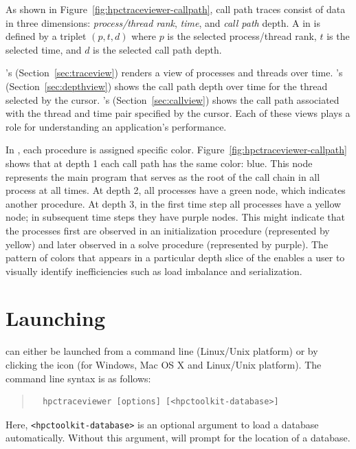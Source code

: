 As shown in Figure~\ref{fig:hpctraceviewer-callpath},  call path traces consist of data in three dimensions: \emph{process/thread rank}, \emph{time}, and \emph{call path} depth.
A \emph{\crosshair} in \hpctraceviewer{} is defined by a triplet $(p,t,d)$ where $p$ is the selected process/thread rank, $t$ is the selected time, and $d$ is the selected call path depth. 

\hpctraceviewer{}'s  \emph{\traceview} (Section~\ref{sec:traceview}) renders a view of processes and threads over time. \hpctraceviewer{}'s  \emph{\depthview} (Section~\ref{sec:depthview}) shows the call path depth over time for the thread selected by the cursor. \hpctraceviewer{}'s  \emph{\callview}  (Section~\ref{sec:callview}) shows the call path associated with the thread and time pair specified by the cursor. 
Each of these views plays a role for understanding an application's performance.

In \hpctraceviewer, each procedure is assigned specific color. Figure~\ref{fig:hpctraceviewer-callpath} shows that at depth 1   each call path has the same color: blue. This node represents the main program that serves as the root of the call chain in all process at all times. At depth 2, all processes have a green node, which indicates another procedure. 
At depth 3, in the first time step all processes  have a yellow node; in subsequent time steps they have purple nodes.
This might indicate that the processes first are observed in an initialization procedure (represented by yellow) and later observed in a solve procedure (represented by purple). The pattern of colors that appears in a particular depth slice of the \traceview{} enables a user to visually identify inefficiencies such as load imbalance and serialization.


\section{Launching}

\hpctraceviewer{} can either be launched from a command line (Linux/Unix platform) or by clicking the \hpctraceviewer{} icon (for Windows, Mac OS X and Linux/Unix platform).
The command line syntax is as follows:
\begin{quote}
\begin{verbatim}
  hpctraceviewer [options] [<hpctoolkit-database>]
\end{verbatim}
\end{quote}
Here, \texttt{<hpctoolkit-database>} is an optional argument to load a database automatically.
Without this argument, \hpctraceviewer{} will prompt for the location of a database.


